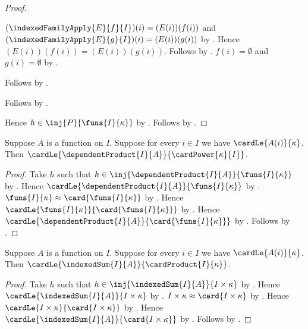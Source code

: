 \begin{proof}
\begin{subproof}
\begin{subproof}
\begin{subproof}
\begin{byCase}
                        $(\indexedFamilyApply{E}{f}{I})(i)
                            =(E(i))(f(i))$ and
                            $(\indexedFamilyApply{E}{g}{I})(i)
                            =(E(i))(g(i))$
                            by .
                        Hence $(E(i))(f(i))=(E(i))(g(i))$.
                        Follows by .
                        $f(i)=\emptyset$ and $g(i)=\emptyset$
                            by .
                \end{byCase}
            \end{subproof}
            Follows by .
        \end{subproof}
        Follows by .
    \end{subproof}
    Hence $h\in\inj{P}{\funs{I}{\kappa}}$
        by .
    Follows by \auto.
\end{proof}

\begin{corollary}\label{dependent_product_cardinal_bound}
    Suppose $A$ is a function on $I$.
    Suppose for every $i\in I$ we have $\cardLe{A(i)}{\kappa}$.
    Then $\cardLe{\dependentProduct{I}{A}}
        {\cardPower{\kappa}{I}}$.
\end{corollary}
\begin{proof}
    Take $h$ such that
        $h\in\inj{\dependentProduct{I}{A}}{\funs{I}{\kappa}}$
        by .
    Hence $\cardLe{\dependentProduct{I}{A}}{\funs{I}{\kappa}}$
        by .
    $\funs{I}{\kappa}\approx\card{\funs{I}{\kappa}}$
        by .
    Hence $\cardLe{\funs{I}{\kappa}}{\card{\funs{I}{\kappa}}}$
        by .
    Hence $\cardLe{\dependentProduct{I}{A}}
        {\card{\funs{I}{\kappa}}}$
        by .
    Follows by .
\end{proof}

\begin{corollary}\label{indexed_sum_cardinal_product_bound}
    Suppose $A$ is a function on $I$.
    Suppose for every $i\in I$ we have $\cardLe{A(i)}{\kappa}$.
    Then $\cardLe{\indexedSum{I}{A}}{\cardProduct{I}{\kappa}}$.
\end{corollary}
\begin{proof}
    Take $h$ such that
        $h\in\inj{\indexedSum{I}{A}}{I\times\kappa}$
        by .
    Hence $\cardLe{\indexedSum{I}{A}}{I\times\kappa}$
        by .
    $I\times\kappa\approx\card{I\times\kappa}$
        by .
    Hence $\cardLe{I\times\kappa}{\card{I\times\kappa}}$
        by .
    Hence $\cardLe{\indexedSum{I}{A}}{\card{I\times\kappa}}$
        by .
    Follows by .
\end{proof}

